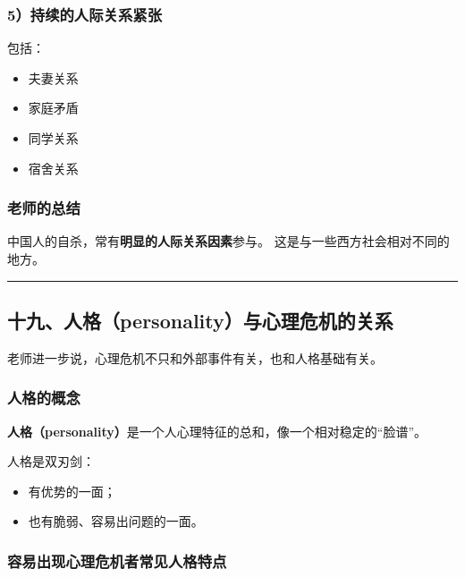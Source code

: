 \documentclass[
  chinese,
  9pt,
  a4paper,
]{ctexart}
\providecommand{\tightlist}{%
  \setlength{\itemsep}{0pt}\setlength{\parskip}{0pt}}
\begin{document}
\subsubsection{5）持续的人际关系紧张}\label{ux6301ux7eedux7684ux4ebaux9645ux5173ux7cfbux7d27ux5f20}

包括：

\begin{itemize}
\tightlist
\item
  夫妻关系
\item
  家庭矛盾
\item
  同学关系
\item
  宿舍关系
\end{itemize}

\subsubsection{老师的总结}\label{ux8001ux5e08ux7684ux603bux7ed3}

中国人的自杀，常有\textbf{明显的人际关系因素}参与。
这是与一些西方社会相对不同的地方。

\begin{center}\rule{0.5\linewidth}{0.5pt}\end{center}

\subsection{十九、人格（personality）与心理危机的关系}\label{ux5341ux4e5dux4ebaux683cpersonalityux4e0eux5fc3ux7406ux5371ux673aux7684ux5173ux7cfb}

老师进一步说，心理危机不只和外部事件有关，也和人格基础有关。

\subsubsection{人格的概念}\label{ux4ebaux683cux7684ux6982ux5ff5}

\textbf{人格（personality）}是一个人心理特征的总和，像一个相对稳定的``脸谱''。

人格是双刃剑：

\begin{itemize}
\tightlist
\item
  有优势的一面；
\item
  也有脆弱、容易出问题的一面。
\end{itemize}

\subsubsection{容易出现心理危机者常见人格特点}\label{ux5bb9ux6613ux51faux73b0ux5fc3ux7406ux5371ux673aux8005ux5e38ux89c1ux4ebaux683cux7279ux70b9}
\end{document}

